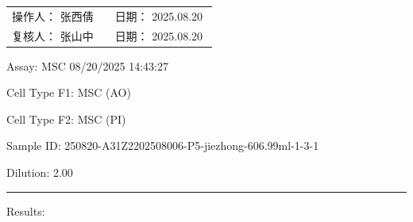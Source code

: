 \documentclass[UTF8,10pt,a4paper,fontset=fandol]{ctexart}
\newcommand{\fieldvalue}[1]{#1}
\newcommand{\handwritten}[1]{#1}
\begin{document}
\vfill

\noindent
\begin{tabular}{@{}p{0.48\linewidth}p{0.48\linewidth}@{}}
操作人：
\fieldvalue{\handwritten{张西倩}}
&
日期：
\fieldvalue{\handwritten{2025.08.20}}
\\[0.8em]
复核人：
\fieldvalue{\handwritten{张山中}}
&
日期：
\fieldvalue{\handwritten{2025.08.20}}
\end{tabular}

\newpage

\small
\ttfamily

Assay:
\fieldvalue{MSC}
\hfill
\fieldvalue{08/20/2025 14:43:27}

\vspace{1em}

Cell Type F1:
\fieldvalue{MSC (AO)}

Cell Type F2:
\fieldvalue{MSC (PI)}

\vspace{1em}

Sample ID:
\fieldvalue{250820-A31Z2202508006-P5-jiezhong-606.99ml-1-3-1}

Dilution:
\fieldvalue{2.00}

\vspace{1em}
\hrule
\vspace{1em}

Results:

\vspace{0.5em}
\end{document}
